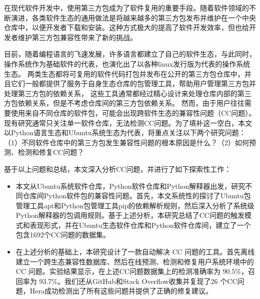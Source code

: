 \begin{cabstract}
在现代软件开发中，使用第三方包成为了软件复用的重要手段。随着软件领域的不断演进，各类软件生态的通用做法是将越来越多的第三方包发布并维护在一个中央仓库中，以便开发者下载和安装。这种方式极大的提高了软件开发效率，但也给开发者维护第三方包兼容性带来了新的挑战。

目前，随着编程语言的飞速发展，许多语言都建立了自己的软件生态，与此同时，操作系统作为基础软件的代表，也演化出了以各种linux发行版为代表的操作系统生态。
两类生态都将可复用的软件代码打包并发布在公开的第三方包仓库中，并且它们一般都提供了服务于自身生态仓库的包管理工具，帮助用户管理第三方包并处理第三方包的依赖关系，
这些工具通常都经过精心设计来处理仓库内部的第三方包依赖关系，但是不考虑仓库间的第三方包依赖关系。
然而，由于用户往往需要使用来自不同仓库的软件包，可能会出现跨软件生态的兼容性问题（CC问题）。现有研究通常只关注单一软件仓库，无法检测CC问题。为了填补这一空白，本文以Python语言生态和Ubuntu系统生态为代表，将重点关注以下两个研究问题：（1）不同软件仓库中的第三方包发生兼容性问题的根本原因是什么？（2）如何预测、检测和修复CC问题？

基于以上问题和总结，本文深入分析CC问题，并进行了如下探索性工作：
\begin{itemize}
	\item 本文从Ubuntu系统软件仓库，Python软件仓库和Python解释器出发，研究不同仓库间Python软件包的兼容性问题。首先，本文系统性的探讨了Ubuntu包管理工具apt和Python包管理工具pip的依赖解析规则，然后深入分析了系统级Python解释器的包调用规则。基于上述分析，本研究总结了CC问题的触发模式和表现形式，并在Ubuntu生态软件仓库和Python软件仓库间，建立了一个包含1692个CC问题的数据集。
	\item 在上述分析的基础上，本研究设计了一款自动解决 CC 问题的工具\tool{}。\tool{}首先离线建立一个跨生态兼容性数据库、然后在线预测、检测和修复用户系统环境中的 CC 问题。实验结果显示，\tool{}在上述CC问题数据集上的检测准确率为 90.5\%，召回率为 93.7\%。我们还从GitHub和Stack Overflow收集并复现了26 个CC问题，Hera成功检测出了所有这些问题并提供了正确的修复建议。
\end{itemize}
\end{cabstract}

